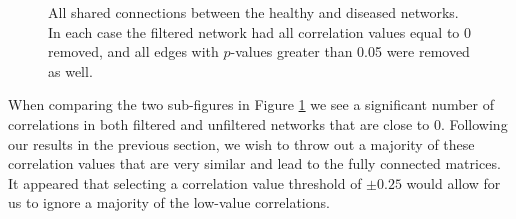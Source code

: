 \begin{figure}[!hbt]
\centering
{}
    \hfill
{}
\caption{All shared connections between the healthy and diseased networks. In each case the filtered network had all correlation values equal to 0 removed, and all edges with $p$-values greater than 0.05 were removed as well. }
\label{fig:buffer-all}
\end{figure}

When comparing the two sub-figures in Figure \ref{fig:buffer-all} we see a significant number of correlations in both filtered and unfiltered networks that are close to 0. Following our results in the previous section, we wish to throw out a majority of these correlation values that are very similar and lead to the fully connected matrices. It appeared that selecting a correlation value threshold of $\pm 0.25$ would allow for us to ignore a majority of the low-value correlations.

